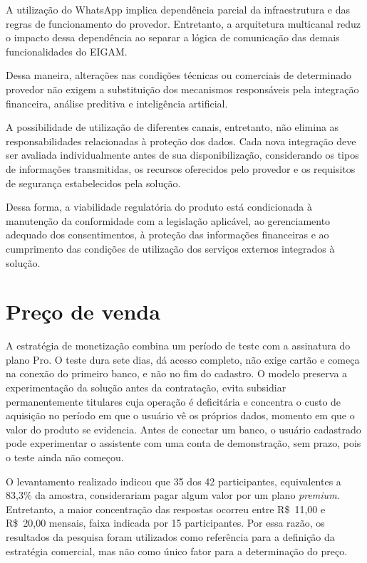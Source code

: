 A utilização do WhatsApp implica dependência parcial da infraestrutura e das regras de funcionamento do provedor. Entretanto, a arquitetura multicanal reduz o impacto dessa dependência ao separar a lógica de comunicação das demais funcionalidades do EIGAM.

Dessa maneira, alterações nas condições técnicas ou comerciais de determinado provedor não exigem a substituição dos mecanismos responsáveis pela integração financeira, análise preditiva e inteligência artificial.

A possibilidade de utilização de diferentes canais, entretanto, não elimina as responsabilidades relacionadas à proteção dos dados. Cada nova integração deve ser avaliada individualmente antes de sua disponibilização, considerando os tipos de informações transmitidas, os recursos oferecidos pelo provedor e os requisitos de segurança estabelecidos pela solução.

Dessa forma, a viabilidade regulatória do produto está condicionada à manutenção da conformidade com a legislação aplicável, ao gerenciamento adequado dos consentimentos, à proteção das informações financeiras e ao cumprimento das condições de utilização dos serviços externos integrados à solução.

\section{Preço de venda}\label{sec:preco}

A estratégia de monetização combina um período de teste com a assinatura do plano Pro. O teste dura sete dias, dá acesso completo, não exige cartão e começa na conexão do primeiro banco, e não no fim do cadastro. O modelo preserva a experimentação da solução antes da contratação, evita subsidiar permanentemente titulares cuja operação é deficitária e concentra o custo de aquisição no período em que o usuário vê os próprios dados, momento em que o valor do produto se evidencia. Antes de conectar um banco, o usuário cadastrado pode experimentar o assistente com uma conta de demonstração, sem prazo, pois o teste ainda não começou.

O levantamento realizado indicou que 35 dos 42 participantes, equivalentes a 83,3\% da amostra, considerariam pagar algum valor por um plano \textit{premium}. Entretanto, a maior concentração das respostas ocorreu entre R\$~11,00 e R\$~20,00 mensais, faixa indicada por 15 participantes. Por essa razão, os resultados da pesquisa foram utilizados como referência para a definição da estratégia comercial, mas não como único fator para a determinação do preço.

